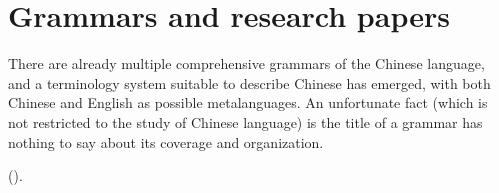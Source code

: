 \section{Grammars and research papers}

There are already multiple comprehensive grammars of the Chinese language, and a terminology system 
suitable to describe Chinese has emerged, with both Chinese and English as possible metalanguages. 
An unfortunate fact (which is not restricted to the study of Chinese language) is the title of a grammar
has nothing to say about its coverage and organization. 


(\citealt{po2015chinese}).